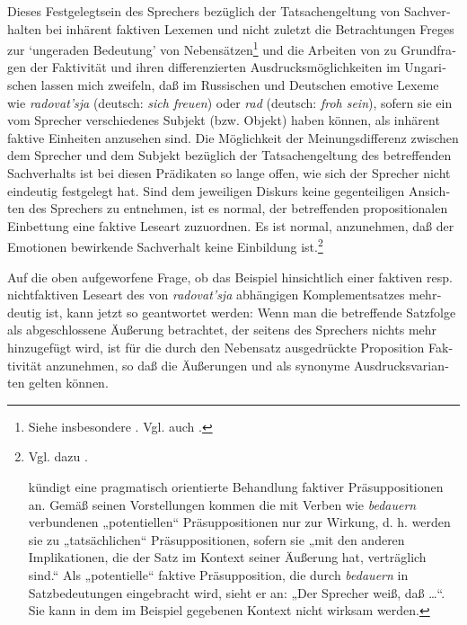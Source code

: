 \documentclass[output=paper]{langscibook}
\begin{document}
\begin{otherlanguage}{german}
Dieses Festgelegtsein des Sprechers bezüglich der Tatsachengeltung von Sach\-ver\-hal\-ten bei inhärent faktiven Lexemen und nicht zuletzt die Betrachtungen Freges zur ‘ungeraden Bedeutung’ von Nebensätzen\footnote{Siehe insbesondere \citet{frege1892uber-sinn-und-bedeutung}. Vgl. auch \citet[169 ff.]{seuren1975tussen-taal-en-denken:-een-bijdrage-tot-de-empirische-funderingen-van-de-semantiek.-deutsche-ubersetzung:-zwischen-sprache-und-denken:-ein-beitrag-zur-empirischen-begrundung-der-semantik}.} und die Arbeiten von \citet{kiefer1978factivity-in-hungarian, kiefer1978functional-sentence-perspective-and-presuppositions} zu Grundfragen der Faktivität und ihren differenzierten Ausdrucks\-mög\-lich\-keiten im Ungarischen lassen mich zweifeln, daß im Russischen und Deutschen emotive Lexeme wie \textit{radovat’sja} (deutsch: \textit{sich freuen}) oder \textit{rad} (deutsch: \textit{froh sein}), sofern sie ein vom Sprecher verschiedenes Subjekt (bzw. Objekt) haben können, als inhärent faktive Einheiten anzusehen sind. Die Mög\-lich\-keit der Mei\-nungs\-differenz zwischen dem Sprecher und dem Subjekt bezüglich der Tatsachengeltung des betreffenden Sachverhalts ist bei diesen Prädikaten so lange offen, wie sich der Sprecher nicht eindeutig festgelegt hat. Sind dem jeweiligen Diskurs keine gegenteiligen Ansichten des Sprechers zu entnehmen, ist es normal, der betreffenden propositionalen Einbettung eine faktive Leseart zuzuordnen. Es ist normal, anzunehmen, daß der Emotionen bewirkende Sachverhalt keine Einbildung ist.\footnote{Vgl. dazu \citet[477 f.]{rosenberg1975factives-that-arent-so-in}.

\citet[14]{gazdar1978eine-pragmatisch-semantische-mischtheorie-der-bedeutung} kündigt eine pragmatisch orientierte Behandlung faktiver Präsuppositionen an. Gemäß seinen Vorstellungen kommen die mit Verben wie \textit{bedauern} verbundenen „potentiellen“ Präsuppositionen nur zur Wirkung, d. h. werden sie zu „tatsächlichen“ Präsuppositionen, sofern sie „mit den anderen Implikationen, die der Satz im Kontext seiner Äußerung hat, verträglich sind.“ Als „potentielle“ faktive Präsupposition, die durch \textit{bedauern} in Satzbedeutungen eingebracht wird, sieht er an: „Der Sprecher weiß, daß …“. Sie kann in dem im Beispiel  gegebenen Kontext nicht wirksam werden.}

Auf die oben aufgeworfene Frage, ob das Beispiel  hinsichtlich einer faktiven resp. nichtfaktiven Leseart des von \textit{radovat’sja} abhängigen Komplement\-satzes mehrdeutig ist, kann jetzt so geantwortet werden: Wenn man die be\-tref\-fende Satzfolge als abgeschlossene Äußerung betrachtet, der seitens des Spre\-chers nichts mehr hinzugefügt wird, ist für die durch den Nebensatz ausgedrückte Proposition Faktivität anzunehmen, so daß die Äußerungen  und  als sy\-no\-ny\-me Ausdrucksvarianten gelten können.


\end{otherlanguage}
\end{document}
